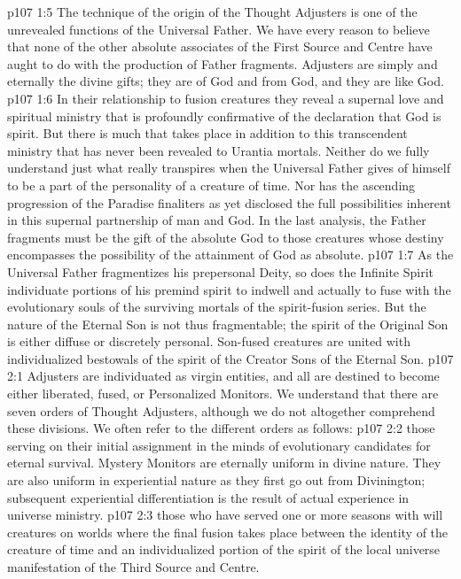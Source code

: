 \vs p107 1:5 The technique of the origin of the Thought Adjusters is one of the unrevealed functions of the Universal Father. We have every reason to believe that none of the other absolute associates of the First Source and Centre have aught to do with the production of Father fragments. Adjusters are simply and eternally the divine gifts; they are of God and from God, and they are like God.
\vs p107 1:6 In their relationship to fusion creatures they reveal a supernal love and spiritual ministry that is profoundly confirmative of the declaration that God is spirit. But there is much that takes place in addition to this transcendent ministry that has never been revealed to Urantia mortals. Neither do we fully understand just what really transpires when the Universal Father gives of himself to be a part of the personality of a creature of time. Nor has the ascending progression of the Paradise finaliters as yet disclosed the full possibilities inherent in this supernal partnership of man and God. In the last analysis, the Father fragments must be the gift of the absolute God to those creatures whose destiny encompasses the possibility of the attainment of God as absolute.
\vs p107 1:7 \pc As the Universal Father fragmentizes his prepersonal Deity, so does the Infinite Spirit individuate portions of his premind spirit to indwell and actually to fuse with the evolutionary souls of the surviving mortals of the spirit\hyp{}fusion series. But the nature of the Eternal Son is not thus fragmentable; the spirit of the Original Son is either diffuse or discretely personal. Son\hyp{}fused creatures are united with individualized bestowals of the spirit of the Creator Sons of the Eternal Son.
\vs p107 2:1 Adjusters are individuated as virgin entities, and all are destined to become either liberated, fused, or Personalized Monitors. We understand that there are seven orders of Thought Adjusters, although we do not altogether comprehend these divisions. We often refer to the different orders as follows:
\vs p107 2:2 \bibnobreakspace {} those serving on their initial assignment in the minds of evolutionary candidates for eternal survival. Mystery Monitors are eternally uniform in divine nature. They are also uniform in experiential nature as they first go out from Divinington; subsequent experiential differentiation is the result of actual experience in universe ministry.
\vs p107 2:3 \bibnobreakspace {} those who have served one or more seasons with will creatures on worlds where the final fusion takes place between the identity of the creature of time and an individualized portion of the spirit of the local universe manifestation of the Third Source and Centre.
